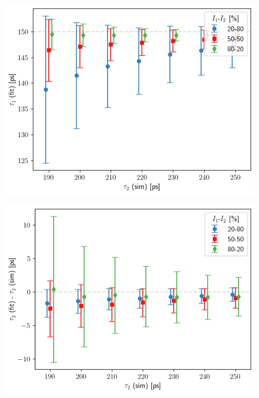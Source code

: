\begin{minipage}{.5\linewidth}
    \centering
    \includegraphics[width=\linewidth]{Batch 3/regular IRF/tau1 150/output/plotfin/t1.png}
    \label{fig:150-t1}
\end{minipage}
\begin{minipage}{.5\linewidth}
    \centering
    \includegraphics[width=\linewidth]{Batch 3/regular IRF/tau1 150/output/plotfin/t2.png}
    \label{fig:150-t2}
\end{minipage}
